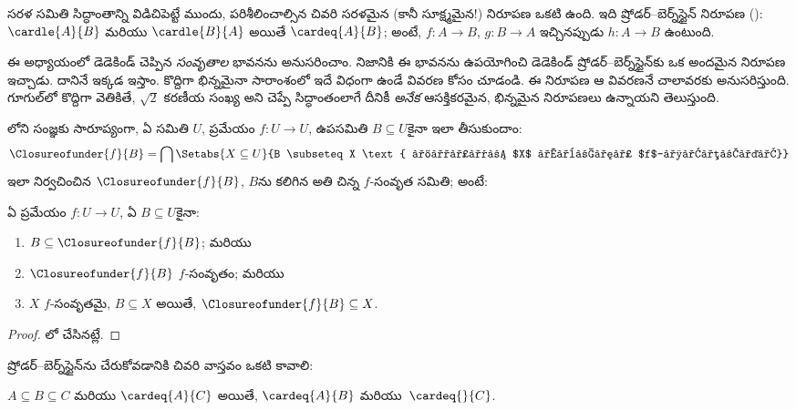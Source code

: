 \documentclass[../../../include/open-logic-section]{subfiles}
\begin{document}


సరళ సమితి సిద్ధాంతాన్ని విడిచిపెట్టే ముందు, పరిశీలించాల్సిన చివరి
సరళమైన (కానీ సూక్ష్మమైన!) నిరూపణ ఒకటి ఉంది. ఇది
ష్రోడర్--బెర్న్‌స్టైన్ నిరూపణ
():
$\cardle{A}{B}$ మరియు $\cardle{B}{A}$ అయితే $\cardeq{A}{B}$;
అంటే,  $f \colon A \to B$, $g \colon B \to A$
ఇచ్చినప్పుడు  $h \colon A \to B$ ఉంటుంది.

ఈ అధ్యాయంలో డెడెకిండ్ చెప్పిన \emph{సంవృతాల} భావనను అనుసరించాం.
నిజానికి ఈ భావనను ఉపయోగించి డెడెకిండ్ ష్రోడర్--బెర్న్‌స్టైన్‌కు ఒక
అందమైన నిరూపణ ఇచ్చాడు. దానినే ఇక్కడ ఇస్తాం. కొద్దిగా భిన్నమైనా
సారాంశంలో ఇదే విధంగా ఉండే వివరణ కోసం
\citet[pp.~157--8]{Potter2004} చూడండి. ఈ నిరూపణ ఆ వివరణనే చాలావరకు అనుసరిస్తుంది.
గూగుల్‌లో కొద్దిగా వెతికితే, $\sqrt{2}$ కరణీయ సంఖ్య అని చెప్పే సిద్ధాంతంలాగే దీనికీ
\emph{అనేక} ఆసక్తికరమైన, భిన్నమైన నిరూపణలు ఉన్నాయని తెలుస్తుంది.

లోని సంజ్ఞకు సారూప్యంగా,
ఏ సమితి $U$, ప్రమేయం $f \colon U \to U$, ఉపసమితి $B \subseteq U$కైనా
ఇలా తీసుకుందాం:
\[
	\Closureofunder{f}{B} = \bigcap \Setabs{X \subseteq U}{B \subseteq X
	\text{ మరియు $X$ అనేది $f$-సంవృతం}}
\]
ఇలా నిర్వచించిన $\Closureofunder{f}{B}$, $B$ను కలిగిన అతి చిన్న
$f$-సంవృత సమితి; అంటే:

\begin{lem}
	ఏ ప్రమేయం $f \colon U \to U$, ఏ $B \subseteq U$కైనా:
	\begin{enumerate}
		\item{} $B \subseteq \Closureofunder{f}{B}$; మరియు
		\item{} $\Closureofunder{f}{B}$ $f$-సంవృతం; మరియు
		\item{} $X$ $f$-సంవృతమై, $B
		\subseteq X$ అయితే, $\Closureofunder{f}{B} \subseteq X$.
	\end{enumerate}
\end{lem}

\begin{proof}
లో చేసినట్లే.
\end{proof}

ష్రోడర్--బెర్న్‌స్టైన్‌ను చేరుకోవడానికి చివరి వాస్తవం ఒకటి కావాలి:

\begin{prop}
$A \subseteq B \subseteq C$ మరియు $\cardeq{A}{C}$ అయితే,
$\cardeq{A}{B}$ మరియు~$\cardeq{}{C}$.
\end{prop}
\end{document}
